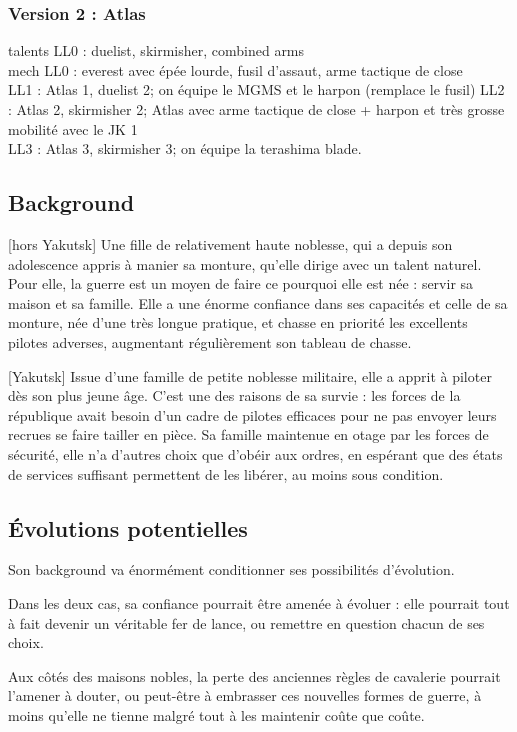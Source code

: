 \documentclass[10pt,a4paper]{article}
\begin{document}
\subsubsection{Version 2 : Atlas}
talents LL0 : duelist, skirmisher, combined arms\\
mech LL0 : everest avec épée lourde, fusil d'assaut, arme tactique de close\\
LL1 : Atlas 1, duelist 2; on équipe le MGMS et le harpon (remplace le fusil)
LL2 : Atlas 2, skirmisher 2; Atlas avec arme tactique de close + harpon et très grosse mobilité avec le JK 1\\
LL3 : Atlas 3, skirmisher 3; on équipe la terashima blade.
\subsection{Background}
[hors Yakutsk] Une fille de relativement haute noblesse, qui a depuis son adolescence appris à manier sa monture, qu'elle dirige avec un talent naturel. Pour elle, la guerre est un moyen de faire ce pourquoi elle est née : servir sa maison et sa famille. Elle a une énorme confiance dans ses capacités et celle de sa monture, née d'une très longue pratique, et chasse en priorité les excellents pilotes adverses, augmentant régulièrement son tableau de chasse.

[Yakutsk] Issue d'une famille de petite noblesse militaire, elle a apprit à piloter dès son plus jeune âge. C'est une des raisons de sa survie : les forces de la république avait besoin d'un cadre de pilotes efficaces pour ne pas envoyer leurs recrues se faire tailler en pièce. Sa famille maintenue en otage par les forces de sécurité, elle n'a d'autres choix que d'obéir aux ordres, en espérant que des états de services suffisant permettent de les libérer, au moins sous condition.
\subsection{Évolutions potentielles}
Son background va énormément conditionner ses possibilités d'évolution.

Dans les deux cas, sa confiance pourrait être amenée à évoluer : elle pourrait tout à fait devenir un véritable fer de lance, ou remettre en question chacun de ses choix.

Aux côtés des maisons nobles, la perte des anciennes règles de cavalerie pourrait l'amener à douter, ou peut-être à embrasser ces nouvelles formes de guerre, à moins qu'elle ne tienne malgré tout à les maintenir coûte que coûte.
\end{document}
